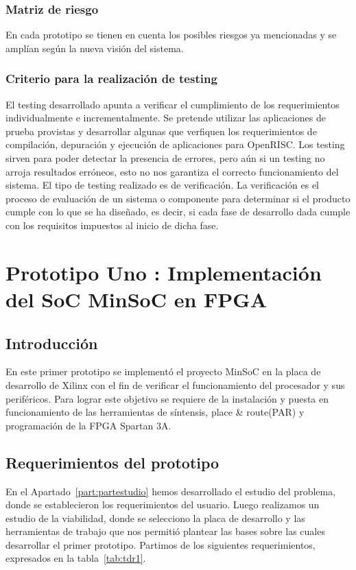 		\subsection{Matriz de riesgo}
En cada prototipo se tienen en cuenta los posibles riesgos ya mencionadas y se amplían según la nueva visión del sistema.
		
		\subsection{Criterio para la realización de testing}%
		El testing desarrollado apunta a verificar el cumplimiento de los requerimientos individualmente e incrementalmente. Se pretende utilizar las
		aplicaciones de prueba provistas y desarrollar algunas que verfiquen los requerimientos de compilación, depuración y ejecución de aplicaciones para
		OpenRISC. 
		Los testing sirven para poder detectar la presencia de errores, pero aún si un testing no arroja resultados erróneos, esto no nos garantiza el
		correcto funcionamiento del sistema. El tipo de testing realizado es de verificación. La verificación es el proceso de evaluación de un sistema o
		componente para determinar si el producto cumple con lo que se ha diseñado, es decir, si cada fase de desarrollo dada cumple con los requisitos
		impuestos al inicio de dicha fase.

\newpage
\chapter{Prototipo Uno : Implementación del SoC MinSoC en FPGA}

	\section{Introducción}
		
	En este primer prototipo se implementó el proyecto MinSoC en la placa de desarrollo de Xilinx con el fin de verificar el funcionamiento del procesador y sus periféricos. Para lograr este objetivo se requiere de la instalación y puesta en funcionamiento de las herramientas de síntensis, place \& route(PAR) y programación de la FPGA Spartan 3A. 

	\section{Requerimientos del prototipo}
En el Apartado~\ref{part:partestudio} hemos desarrollado el estudio del problema, donde se establecieron los requerimientos del usuario. Luego realizamos un estudio de la viabilidad, donde se selecciono la placa de desarrollo y las herramientas de trabajo que nos permitió plantear las bases sobre las cuales desarrollar el primer prototipo. Partimos de los siguientes requerimientos, expresados en la tabla~\ref{tab:tdr1}.

